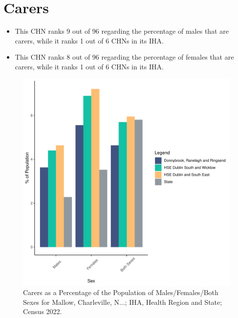 \documentclass{article}
\begin{document}
\section{Carers}\label{sect:Carers}
\begin{itemize}
\item This CHN ranks  9 out of 96 regarding the percentage of males that are carers, while it ranks   1 out of 6 CHNs in its IHA.
\item This CHN ranks  8 out of 96 regarding the percentage of females that are carers, while it ranks   1 out of 6 CHNs in its IHA.
\end{itemize}
\begin{figure}[H]
	\centering
	\includegraphics[width = 150mm]{../figures/CareED.pdf}
	\caption{Carers as a Percentage of the Population of Males/Females/Both Sexes for Mallow, Charleville, N...; IHA, Health Region and State; Census 2022.}
	\label{fig:2ae19629-1a6a-13a3-e055-000000000001}
	\end{figure}
\end{document}

